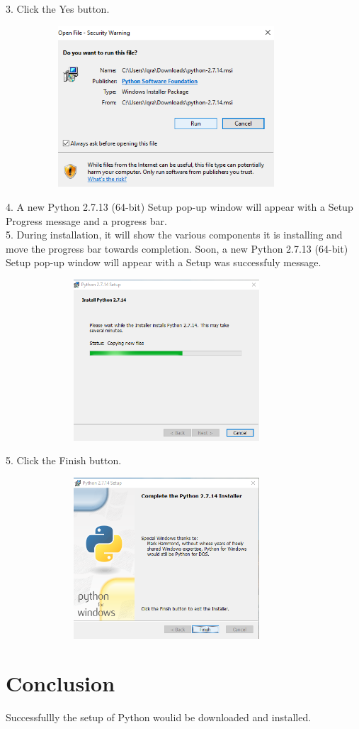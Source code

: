 \documentclass[11pt]{article}            %
\begin{document}
3. Click the Yes button.\\

\begin{center}
  \includegraphics[width=12cm,height=6cm,keepaspectratio]{8.png}\\
\end{center}


4.  A new Python 2.7.13 (64-bit) Setup pop-up window will appear with a Setup Progress message and a progress bar.\\
  



5.  During installation, it will show the various components it is installing and move the progress bar towards completion.
   Soon, a new Python 2.7.13 (64-bit) Setup pop-up window will appear with a Setup was successfuly message.\\ 

\begin{center}
  \includegraphics[width=12cm,height=6cm,keepaspectratio]{6.png}\\
\end{center}



5. Click the Finish button.\\ 
\begin{center}

  \includegraphics[width=12cm,height=6cm,keepaspectratio]{4.png}\\
\end{center}






\section{Conclusion}  
Successfullly the setup of Python woulid be downloaded and installed.
 
\end{document}

